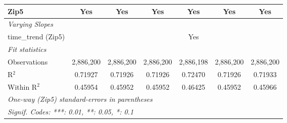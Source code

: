 \begin{table}[H]
{\begin{tabular}{lcccccc}
 Zip5 & Yes & Yes & Yes & Yes & Yes & Yes\\ 

 \midrule \emph{Varying Slopes}&   &   &   &   &   &  \\ 

 time\_trend (Zip5) &  &  &  & Yes &  & \\ 

 \midrule \emph{Fit statistics}&  & & & & & \\ 

 Observations & 2,886,200&2,886,200&2,886,200&2,886,198&2,886,200&2,886,200\\ 

 R$^2$ & 0.71927&0.71926&0.71926&0.72470&0.71926&0.71933\\ 

 Within R$^2$ & 0.45954&0.45952&0.45952&0.46425&0.45952&0.45966\\ 

 \midrule\midrule\multicolumn{7}{l}{\emph{One-way (Zip5) standard-errors in parentheses}}\\ 

 \multicolumn{7}{l}{\emph{Signif. Codes: ***: 0.01, **: 0.05, *: 0.1}}\\ 

 \end{tabular}} 

 \end{table} 

  

